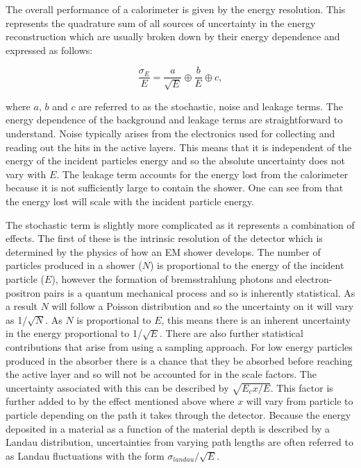 The overall performance of a calorimeter is given by the energy resolution. This represents the quadrature sum of all sources of uncertainty in the energy reconstruction which are usually broken down by their energy dependence and expressed as follows:

\begin{equation}
  \frac{\sigma_E}{E}=\frac{a}{\sqrt{E}} \oplus \frac{b}{E} \oplus c,
\end{equation}

where $a$, $b$ and $c$ are referred to as the stochastic, noise and leakage terms. The energy dependence of the background and leakage terms are straightforward to understand. Noise typically arises from the electronics used for collecting and reading out the hits in the active layers. This means that it is independent of the energy of the incident particles energy and so the absolute uncertainty does not vary with $E$. The leakage term accounts for the energy lost from the calorimeter because it is not sufficiently large to contain the shower. One can see from  that the energy lost will scale with the incident particle energy.

The stochastic term is slightly more complicated as it represents a combination of effects. The first of these is the intrinsic resolution of the detector which is determined by the physics of how an \ac{EM} shower develops. The number of particles produced in a shower ($N$)  is proportional to the energy of the incident particle ($E$), however the formation of bremsstrahlung photons and electron-positron pairs is a quantum mechanical process and so is inherently statistical. As a result $N$ will follow a Poisson distribution and so the uncertainty on it will vary as 1/$\sqrt{N}$. As $N$ is proportional to $E$, this means there is an inherent uncertainty in the energy proportional to 1/$\sqrt{E}$. There are also further statistical contributions that arise from using a sampling approach. For low energy particles produced in the absorber there is a chance that they be absorbed before reaching the active layer and so will not be accounted for in the scale factors. The uncertainty associated with this can be described by $\sqrt{E_{c}x/E}$. This factor is further added to by the effect mentioned above where $x$ will vary from particle to particle depending on the path it takes through the detector. Because the energy deposited in a material as a function of the material depth is described by a Landau distribution, uncertainties from varying path lengths are often referred to as Landau fluctuations with the form $\sigma_{landau}/\sqrt{E}$.

